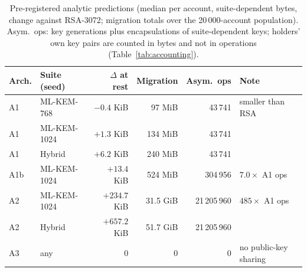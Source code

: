\documentclass[11pt,a4paper]{article}
\begin{document}
\begin{table}[H]
\centering\small
\caption{Pre-registered analytic predictions (median per account, suite-dependent bytes, change against RSA-3072; migration totals over the 20\,000-account population). Asym.\ ops: key generations plus encapsulations of suite-dependent keys; holders' own key pairs are counted in bytes and not in operations (Table~\ref{tab:accounting}).}
\label{tab:pred}
\begin{tabularx}{\textwidth}{l l r r r X}
\toprule
\textbf{Arch.} & \textbf{Suite (seed)} & \textbf{$\Delta$ at rest} & \textbf{Migration} & \textbf{Asym.\ ops} & \textbf{Note}\\
\midrule
A1 & ML-KEM-768 & $-0.4$ KiB & 97 MiB & 43\,741 & smaller than RSA\\
A1 & ML-KEM-1024 & $+1.3$ KiB & 134 MiB & 43\,741 & \\
A1 & Hybrid & $+6.2$ KiB & 240 MiB & 43\,741 & \\
A1b & ML-KEM-1024 & $+13.4$ KiB & 524 MiB & 304\,956 & $7.0\times$ A1 ops\\
A2 & ML-KEM-1024 & $+234.7$ KiB & 31.5 GiB & 21\,205\,960 & $485\times$ A1 ops\\
A2 & Hybrid & $+657.2$ KiB & 51.7 GiB & 21\,205\,960 & \\
A3 & any & 0 & 0 & 0 & no public-key sharing\\
\bottomrule
\end{tabularx}
\end{table}
\end{document}
